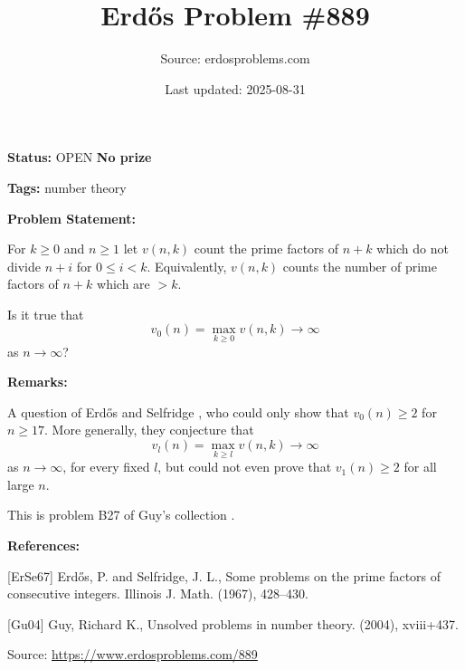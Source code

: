 \documentclass{article}
\title{Erd\H{o}s Problem \#889}
\date{Last updated: 2025-08-31}
\author{Source: erdosproblems.com}
\begin{document}
\maketitle

\noindent\textbf{Status:} OPEN \quad \textbf{No prize}

\noindent\textbf{Tags:} number theory

\medskip
\noindent\textbf{Problem Statement:}

For $k\geq 0$ and $n\geq 1$ let $v(n,k)$ count the prime factors of $n+k$ which do not divide $n+i$ for $0\leq i<k$. Equivalently, $v(n,k)$ counts the number of prime factors of $n+k$ which are $>k$.

Is it true that\[v_0(n)=\max_{k\geq 0}v(n,k)\to \infty\]as $n\to \infty$?

\bigskip
\noindent\textbf{Remarks:}

A question of Erd\H{o}s and Selfridge \cite{ErSe67}, who could only show that $v_0(n)\geq 2$ for $n\geq 17$. More generally, they conjecture that\[v_l(n)=\max_{k\geq l}v(n,k)\to \infty\]as $n\to \infty$, for every fixed $l$, but could not even prove that $v_1(n)\geq 2$ for all large $n$.

This is problem B27 of Guy's collection \cite{Gu04}.

\bigskip
\noindent\textbf{References:}

[ErSe67] Erd\H{o}s, P. and Selfridge, J. L., Some problems on the prime factors of consecutive integers. Illinois J. Math. (1967), 428--430.
 
 [Gu04] Guy, Richard K., Unsolved problems in number theory. (2004), xviii+437.

\bigskip
\noindent\small{Source: \url{https://www.erdosproblems.com/889}}
\end{document}
